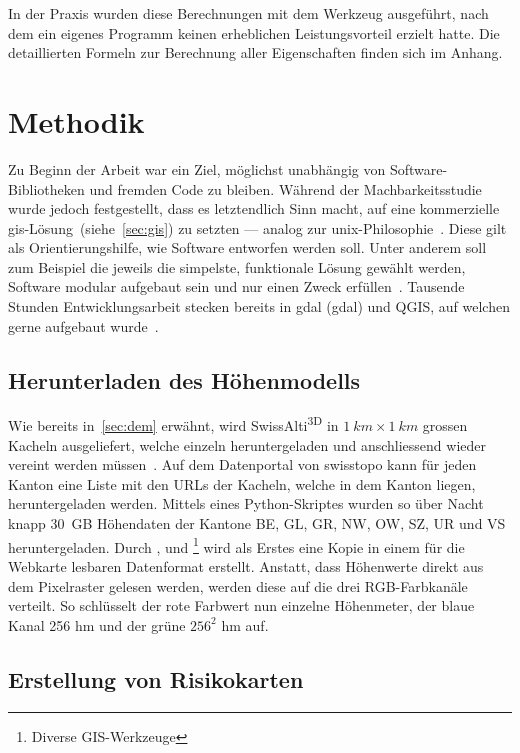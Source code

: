 In der Praxis wurden diese Berechnungen mit dem Werkzeug  ausgeführt, nach dem ein eigenes Programm keinen erheblichen Leistungsvorteil erzielt hatte. Die detaillierten Formeln zur Berechnung aller Eigenschaften finden sich im Anhang.


\vfill

\pagebreak


\section{Methodik}

Zu Beginn der Arbeit war ein Ziel, möglichst unabhängig von Software-Bibliotheken und fremden Code zu bleiben. Während der Machbarkeitsstudie wurde jedoch festgestellt, dass es letztendlich Sinn macht, auf eine kommerzielle \gls{gis}-Lösung~(siehe~\ref{sec:gis}) zu setzten --- analog zur \acrshort{unix}-Philosophie~\cite{unixphil}. Diese gilt als Orientierungshilfe, wie Software entworfen werden soll. Unter anderem soll zum Beispiel die jeweils die simpelste, funktionale Lösung gewählt werden, Software modular aufgebaut sein und nur einen Zweck erfüllen~\cite{unixphil}. Tausende Stunden Entwicklungsarbeit stecken bereits in \acrshort{gdal} (\acrlong{gdal}) und QGIS, auf welchen gerne aufgebaut wurde~\cite{gdalmanual}\cite{qgis}.
\subsection{Herunterladen des Höhenmodells}

Wie bereits in\ \ref{sec:dem} erwähnt, wird SwissAlti\textsuperscript{3D} in $\qty{1}{km} \times \qty{1}{km}$ grossen Kacheln ausgeliefert, welche einzeln heruntergeladen und anschliessend wieder vereint werden müssen~\cite{alti3dprod}. Auf dem Datenportal von swisstopo kann für jeden Kanton eine Liste mit den URLs der Kacheln, welche in dem Kanton liegen, heruntergeladen werden. Mittels eines Python-Skriptes wurden so über Nacht knapp \qty{30}{GB} Höhendaten der Kantone BE, GL, GR, NW, OW, SZ, UR und VS heruntergeladen. Durch ,  und \footnote{Diverse GIS-Werkzeuge} wird als Erstes eine Kopie in einem für die Webkarte lesbaren Datenformat erstellt. Anstatt, dass Höhenwerte direkt aus dem Pixelraster gelesen werden, werden diese auf die drei RGB-Farbkanäle verteilt. So schlüsselt der rote Farbwert nun einzelne Höhenmeter, der blaue Kanal 256 hm und der grüne $256^2$ hm auf.

\subsection{Erstellung von Risikokarten}

